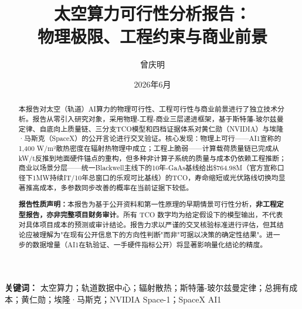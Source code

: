 \documentclass[12pt,a4paper]{article}
\title{太空算力可行性分析报告：\\物理极限、工程约束与商业前景}
\author{曾庆明}
\date{2026年6月}
\begin{document}
\maketitle

\renewcommand{\thefootnote}{\arabic{footnote}}

\begin{abstract}
本报告对太空（轨道）AI算力的物理可行性、工程可行性与商业前景进行了独立技术分析。报告从零引入研究对象，采用物理-工程-商业三层递进框架，基于斯特藩-玻尔兹曼定律、自底向上质量链、三分支TCO模型和四档证据体系对黄仁勋（NVIDIA）与埃隆·马斯克（SpaceX）的公开言论进行交叉验证。核心发现：物理上可行——AI1宣称的1,400 W/m²散热密度在辐射热物理中成立；工程上脆弱——计算载荷质量链已完成从kW/t反推到地面硬件锚点的重构，但多种非计算子系统的质量与成本仍依赖工程推断；商业以场景分层——统一Blackwell主线下的10年-GaAs基线给出\$764.98M（官方宣称口径下1MW持续IT/10年总窗口的乐观可比基线）的TCO，寿命缩短或光伏路线切换均显著推高成本，多参数同步改善的概率在当前证据下较低。

\medskip
\noindent\textbf{报告性质声明：}本报告为基于公开资料和第一性原理的早期情景可行性分析，\textbf{非工程定型报告，亦非完整项目财务审计}。所有 TCO 数字均为给定假设下的模型输出，不代表对具体项目成本的预测或审计结论。报告力求以严谨的交叉核验标准进行评估，但其结论应被理解为"在现有公开信息下的方向性判断"而非"可据以决策的确定性结果"。进一步的数据增量（AI1在轨验证、一手硬件指标公开）将显著影响量化结论的精度。
\end{abstract}

\vspace{1cm}

\textbf{关键词：} 太空算力；轨道数据中心；辐射散热；斯特藩-玻尔兹曼定律；总拥有成本；黄仁勋；埃隆·马斯克；NVIDIA Space-1；SpaceX AI1

\newpage

\tableofcontents
\newpage










\printbibliography

\newpage

\appendix





\end{document}
